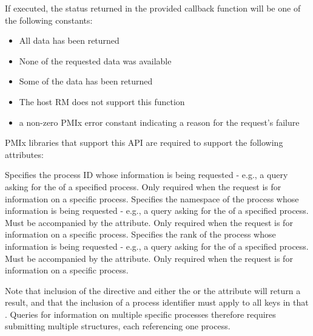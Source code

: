 If executed, the status returned in the provided callback function will be one of the following constants:

\begin{itemize}
\item {} All data has been returned
\item {} None of the requested data was available
\item {} Some of the data has been returned
\item {} The host \ac{RM} does not support this function
\item a non-zero \ac{PMIx} error constant indicating a reason for the request's failure
\end{itemize}

\reqattrstart
\ac{PMIx} libraries that support this \ac{API} are required to support the following attributes:

 Specifies the process ID whose information is being requested - e.g., a query asking for the  of a specified process. Only required when the request is for information on a specific process.
\pastePRIAttributeItemEnd
{} Specifies the namespace of the process whose information is being requested - e.g., a query asking for the  of a specified process. Must be accompanied by the  attribute. Only required when the request is for information on a specific process.
\pastePRIAttributeItemEnd
{} Specifies the rank of the process whose information is being requested - e.g., a query asking for the  of a specified process. Must be accompanied by the  attribute. Only required when the request is for information on a specific process.
\pastePRIAttributeItemEnd

Note that inclusion of the  directive and either the  or the  attribute will return a  result, and that the inclusion of a process identifier must apply to all keys in that . Queries for information on multiple specific processes therefore requires submitting multiple  structures, each referencing one process.

